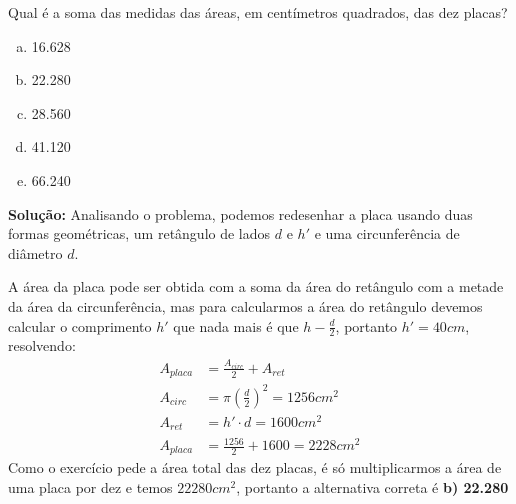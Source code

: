\begin{multicols*}{2}
    \noindent
    Qual é a soma das medidas das áreas, em centímetros quadrados, das dez placas?
    \begin{enumerate}[a)]
        \item 16.628
        \item 22.280
        \item 28.560
        \item 41.120
        \item 66.240
    \end{enumerate}

    \noindent \textbf{Solução:}
    Analisando o problema, podemos redesenhar a placa usando duas formas
    geométricas, um retângulo de lados $d$ e $h'$ e uma circunferência de 
    diâmetro $d$.
    \begin{figure}[H]
    \centering
    \end{figure}

    \noindent A área da placa pode ser obtida com a soma da área do retângulo 
    com a metade da área da circunferência, mas para calcularmos a área do 
    retângulo devemos calcular o comprimento $h'$ que nada mais é que $h-\frac{d}{2}$, 
    portanto $h' = 40cm$, resolvendo:
    \begin{align}
        A_{placa} &= \frac{A_{circ}}{2} + A_{ret}\\[1ex]
        A_{circ} &= \pi\left( \frac{d}{2} \right)^2 = 1256cm^2\\
        A_{ret} &= h'\cdot d = 1600cm^2 \\
        A_{placa} &= \frac{1256}{2} + 1600 = 2228 cm^2
    \end{align}
    \noindent Como o exercício pede a área total das dez placas, é só 
    multiplicarmos a área de uma placa por dez e temos $22280cm^2$, portanto a 
    alternativa correta é \textbf{b) 22.280}\\


\end{multicols*}
